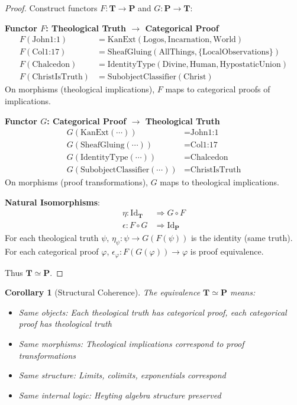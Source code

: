 \documentclass{article}
\newtheorem{corollary}{Corollary}
\begin{document}
\begin{proof}
Construct functors $F: \mathbf{T} \to \mathbf{P}$ and $G: \mathbf{P} \to \mathbf{T}$:

\textbf{Functor $F$: Theological Truth $\to$ Categorical Proof}
\begin{align*}
F(\text{John1:1}) &= \text{KanExt}(\text{Logos}, \text{Incarnation}, \text{World}) \\
F(\text{Col1:17}) &= \text{SheafGluing}(\text{AllThings}, \{\text{LocalObservations}\}) \\
F(\text{Chalcedon}) &= \text{IdentityType}(\text{Divine}, \text{Human}, \text{HypostaticUnion}) \\
F(\text{ChristIsTruth}) &= \text{SubobjectClassifier}(\text{Christ})
\end{align*}
On morphisms (theological implications), $F$ maps to categorical proofs of implications.

\textbf{Functor $G$: Categorical Proof $\to$ Theological Truth}
\begin{align*}
G(\text{KanExt}(\cdots)) &= \text{John1:1} \\
G(\text{SheafGluing}(\cdots)) &= \text{Col1:17} \\
G(\text{IdentityType}(\cdots)) &= \text{Chalcedon} \\
G(\text{SubobjectClassifier}(\cdots)) &= \text{ChristIsTruth}
\end{align*}
On morphisms (proof transformations), $G$ maps to theological implications.

\textbf{Natural Isomorphisms}:
\begin{align*}
\eta: \mathrm{Id}_{\mathbf{T}} &\Rightarrow G \circ F \\
\epsilon: F \circ G &\Rightarrow \mathrm{Id}_{\mathbf{P}}
\end{align*}
For each theological truth $\psi$, $\eta_\psi: \psi \to G(F(\psi))$ is the identity (same truth).
For each categorical proof $\varphi$, $\epsilon_\varphi: F(G(\varphi)) \to \varphi$ is proof equivalence.

Thus $\mathbf{T} \simeq \mathbf{P}$.
\end{proof}

\begin{corollary}[Structural Coherence]
The equivalence $\mathbf{T} \simeq \mathbf{P}$ means:
\begin{itemize}
    \item Same objects: Each theological truth has categorical proof, each categorical proof has theological truth
    \item Same morphisms: Theological implications correspond to proof transformations
    \item Same structure: Limits, colimits, exponentials correspond
    \item Same internal logic: Heyting algebra structure preserved
\end{itemize}
\end{corollary}
\end{document}
